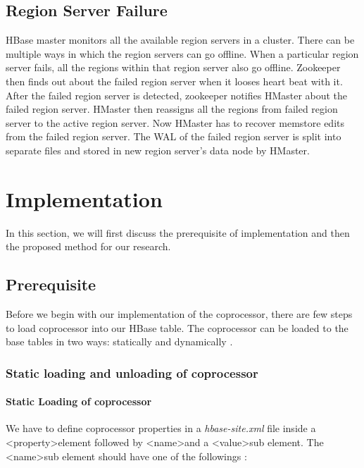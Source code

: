 \documentclass[11pt,a4paper,bibtotoc,idxtotoc,headsepline,footsepline,footexclude,BCOR12mm,DIV13]{scrbook}
\begin{document}
\section{Region Server Failure}
\label{Region Server Failure}
HBase master monitors all the available region servers in a cluster. There can be multiple ways in which the region servers can go offline. When a particular region server fails, all the regions within that region server also go offline. Zookeeper then finds out about the failed region server when it looses heart beat with it. After the failed region server is detected, zookeeper notifies HMaster about the failed region server. HMaster then reassigns all the regions from failed region server to the active region server. Now HMaster has to recover memstore edits from the failed region server. The WAL of the failed region server is split into separate files and stored in new region server's data node by HMaster.


\chapter{Implementation}
\label{Implementation}
In this section, we will first discuss the prerequisite of implementation and then the proposed method for our research.

\section{Prerequisite}
Before we begin with our implementation of the coprocessor, there are few steps to load coprocessor into our HBase table. The coprocessor can be loaded to the base tables in two ways: statically and dynamically \cite{loading:coprocessors}. 

\subsection{Static loading and unloading of coprocessor}

\subsubsection{Static Loading of coprocessor}
We have to define coprocessor properties in a \emph{hbase-site.xml} file inside a \textless property\textgreater \space element followed by \textless name\textgreater \space and a \textless value\textgreater \space sub element. The \textless name\textgreater \space sub element should have one of the followings \cite{hbase:site}:
\end{document}
